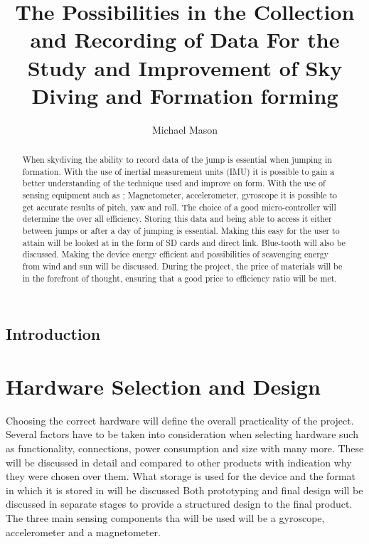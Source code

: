 \documentclass{report}
\begin{document}
\title{The Possibilities in the Collection and Recording of Data For the Study and Improvement of Sky Diving and Formation forming}
\author{Michael Mason}

\maketitle

\begin{abstract}
When skydiving the ability to record data of the jump is essential when jumping in formation. With the use of inertial measurement units (IMU) it is possible to gain a better understanding of the technique used and improve on form. With the use of sensing equipment such as ; Magnetometer, accelerometer, gyroscope it is possible to get accurate results of pitch, yaw and roll. The choice of a good micro-controller will determine the over all efficiency.
Storing this data and being able to access it either between jumps or after a day of jumping is essential. Making this easy for the user to attain will be looked at in the form of SD cards and direct link. Blue-tooth will also be discussed.
Making the device energy efficient and possibilities of scavenging energy from wind and sun will be discussed. During the project, the price of materials will be in the forefront of thought, ensuring that a good price to efficiency ratio will be met.

\end{abstract}

\tableofcontents

\newpage

\section{Introduction}


\chapter{Hardware Selection and Design}
Choosing the correct hardware will define the overall practicality of the project. Several factors have to be taken into consideration when selecting hardware such as functionality, connections, power consumption and size with many more. These will be discussed in detail and compared to other products with indication why they were chosen over them. What storage is used for the device and the format in which it is stored in will be discussed
Both prototyping and final design will be discussed in separate stages to provide a structured design to the final product.
The three main sensing components tha will be used will be a gyroscope, accelerometer and a magnetometer.
\end{document}
